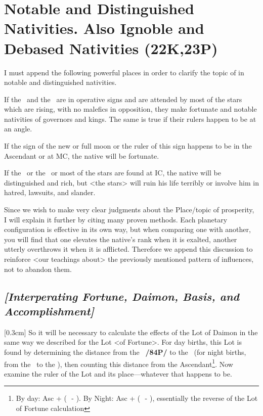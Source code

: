 \section{Notable and Distinguished Nativities. Also Ignoble and Debased Nativities (22K,23P)}

I must append the following powerful places in order to clarify the topic of in notable and distinguished nativities. 

If the \Sun\, and the \Moon\, are in operative signs and are attended by most of the stars which are rising, with no malefics in opposition, they make fortunate and notable nativities of governors and kings. The same is true if their rulers happen to be at an angle. 

If the sign of the new or full moon or the ruler of this sign happens to be in the Ascendant or at MC, the native will be fortunate. 

If the \Sun\, or the \Moon\, or most of the stars are found at IC, the native will be distinguished and rich, but <the stars> will ruin his life terribly or involve him in hatred, lawsuits, and slander.

Since \mndl we wish to make very clear judgments about the Place/topic of prosperity, I will explain it further by citing many proven methods. Each planetary configuration is effective in its own way, but when comparing one with another, you will find that one elevates the native’s rank when it is exalted, another
utterly overthrows it when it is afflicted. Therefore we append this discussion to reinforce <our teachings about> the previously mentioned pattern of influences, not to abandon them.

\subsection{\textit{[Interperating Fortune, Daimon, Basis, and Accomplishment]}}
[0.3cm]
So it will be necessary to calculate the effects of the Lot of Daimon in the same way we described for the Lot <of Fortune>. For day births, this Lot is found by determining the distance from the \Moon\, \textbf{/84P/} to the \Sun\, (for night births, from the \Sun\, to the \Moon), then counting this distance from the Ascendant\footnote{By day: Asc + (\Sun\,\, - \Moon). By Night: Asc + (\Moon\,\, - \Sun), essentially the reverse of the Lot of Fortune calculation}. Now examine the ruler of the Lot and its place—whatever that happens to be. 

